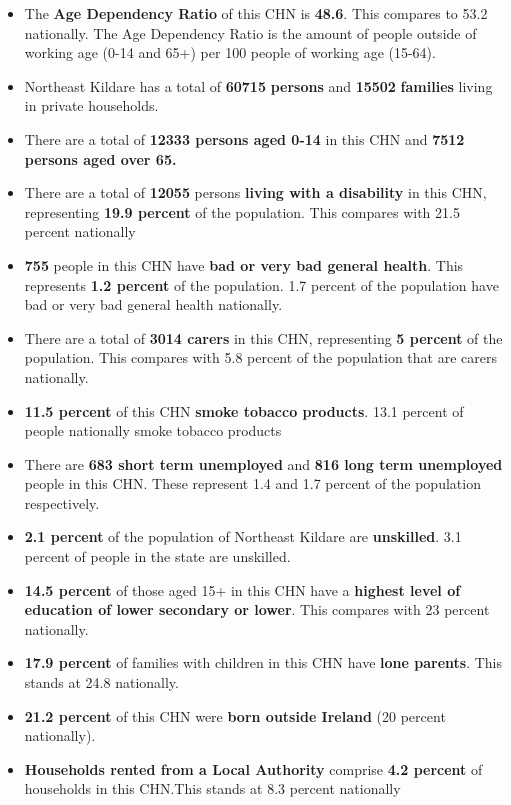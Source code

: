 \documentclass{article}
\begin{document}
\begin{itemize}

\item The \textbf{Age Dependency Ratio} of this CHN is  \textbf{48.6}. This compares to 53.2 nationally. The Age Dependency Ratio is the amount of people outside of working age (0-14 and 65+) per 100 people of working age (15-64). 

\item Northeast Kildare has a total of \textbf{\num{60715}} \textbf{persons} and  \textbf{\num{15502}} \textbf{families} living in private households.

\item There are a total of \textbf{\num{12333} persons aged 0-14} in this CHN and \textbf{\num{7512} persons aged over 65.} 

\item There are a total of \textbf{\num{12055}} persons \textbf{living with a disability} in this CHN, representing \textbf{19.9 percent} of the population. This compares with  21.5 percent nationally

\item \textbf{\num{755}} people in this CHN have \textbf{bad or very bad general health}. This represents \textbf{1.2 percent} of the population. 1.7 percent of the population have bad or very bad general health nationally. 

\item There are a total of \textbf{\num{3014} carers} in this CHN, representing \textbf{5 percent} of the population. This compares with 5.8 percent of the population that are carers nationally. 

\item \textbf{11.5 percent} of this CHN \textbf{smoke tobacco products}. 13.1 percent of people nationally smoke tobacco products

\item There are \textbf{\num{683} short term unemployed} and \textbf{\num{816} long term unemployed} people in this CHN. These represent 1.4 and 1.7 percent of the population respectively.

\item  \textbf{2.1 percent} of the population of Northeast Kildare are \textbf{unskilled}. 3.1 percent of people in the state are unskilled.

\item \textbf{14.5 percent} of those aged 15+ in this CHN have a \textbf{highest level of education of lower secondary or lower}. This compares with 23 percent nationally. 

\item \textbf{17.9 percent} of families with children in this CHN have \textbf{lone parents}. This stands at 24.8 nationally.

\item \textbf{21.2 percent} of this CHN were \textbf{born outside Ireland} (20 percent nationally).

\item \textbf{Households rented from a Local Authority} comprise \textbf{4.2 percent} of households in this CHN.This stands at 8.3 percent nationally

\end{itemize}
\end{document}
